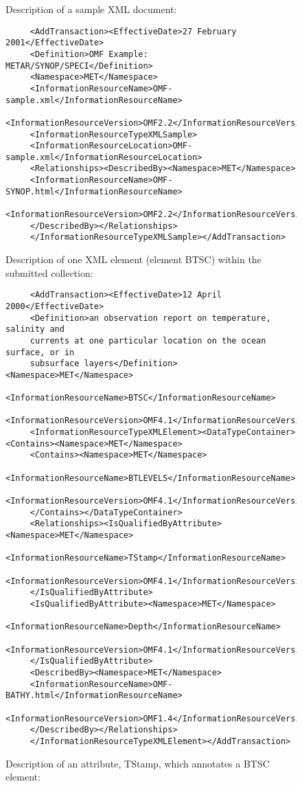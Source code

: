 \documentclass[10pt]{llncs}
\begin{document}
\begin{figure}
Description of a sample XML document:

\begin{verbatim}
     <AddTransaction><EffectiveDate>27 February 2001</EffectiveDate>
     <Definition>OMF Example: METAR/SYNOP/SPECI</Definition>
     <Namespace>MET</Namespace>
     <InformationResourceName>OMF-sample.xml</InformationResourceName>
     <InformationResourceVersion>OMF2.2</InformationResourceVersion>
     <InformationResourceTypeXMLSample>
     <InformationResourceLocation>OMF-sample.xml</InformationResourceLocation>
     <Relationships><DescribedBy><Namespace>MET</Namespace>
     <InformationResourceName>OMF-SYNOP.html</InformationResourceName>
     <InformationResourceVersion>OMF2.2</InformationResourceVersion>
     </DescribedBy></Relationships>
     </InformationResourceTypeXMLSample></AddTransaction>
\end{verbatim}
Description of one XML element (element BTSC) within the submitted
collection:

\begin{verbatim}
     <AddTransaction><EffectiveDate>12 April 2000</EffectiveDate>
     <Definition>an observation report on temperature, salinity and
     currents at one particular location on the ocean surface, or in
     subsurface layers</Definition><Namespace>MET</Namespace>
     <InformationResourceName>BTSC</InformationResourceName>
     <InformationResourceVersion>OMF4.1</InformationResourceVersion>
     <InformationResourceTypeXMLElement><DataTypeContainer><Contains><Namespace>MET</Namespace>
     <Contains><Namespace>MET</Namespace>
     <InformationResourceName>BTLEVELS</InformationResourceName>
     <InformationResourceVersion>OMF4.1</InformationResourceVersion>
     </Contains></DataTypeContainer>
     <Relationships><IsQualifiedByAttribute><Namespace>MET</Namespace>
     <InformationResourceName>TStamp</InformationResourceName>
     <InformationResourceVersion>OMF4.1</InformationResourceVersion>
     </IsQualifiedByAttribute>
     <IsQualifiedByAttribute><Namespace>MET</Namespace>
     <InformationResourceName>Depth</InformationResourceName>
     <InformationResourceVersion>OMF4.1</InformationResourceVersion>
     </IsQualifiedByAttribute>
     <DescribedBy><Namespace>MET</Namespace>
     <InformationResourceName>OMF-BATHY.html</InformationResourceName>
     <InformationResourceVersion>OMF1.4</InformationResourceVersion>
     </DescribedBy></Relationships>
     </InformationResourceTypeXMLElement></AddTransaction>
\end{verbatim}
Description of an attribute, TStamp, which annotates a BTSC
element:


\end{figure}
\end{document}
